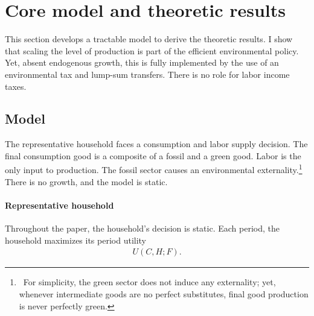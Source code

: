 \section{Core model and theoretic results}\label{sec:mod_an}

This section develops a tractable model  to derive the theoretic results. I show that scaling the level of production is part of the efficient environmental policy. Yet, absent endogenous growth, this is fully implemented by the use of an environmental tax and lump-sum transfers. There is no role for labor income taxes.

\subsection{Model}
The representative household faces a consumption and labor supply decision. The final consumption good is a composite of a fossil and a green good. Labor is the only input to production. The fossil sector causes an environmental externality.\footnote{\ For simplicity, the green sector does not induce any externality; yet, whenever intermediate goods are no perfect substitutes, final good production is never perfectly green.} There is no growth, and the model is static.

\paragraph{Representative household}
Throughout the paper, the household's decision is static. Each period, the household maximizes its period utility
\begin{align*}
U(C,H; F).
\end{align*} 

